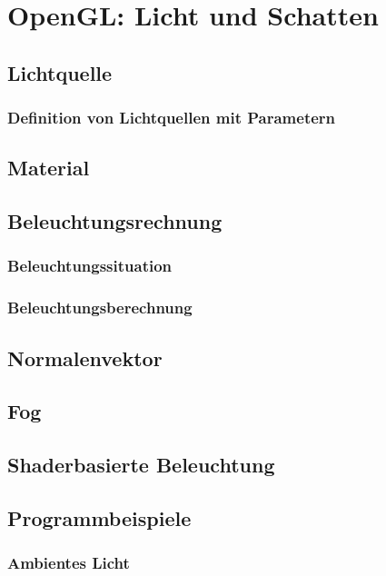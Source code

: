 \documentclass{scrreprt}
\begin{document}
\chapter{OpenGL: Licht und Schatten}

\section{Lichtquelle}

\subsection{Definition von Lichtquellen mit Parametern}

\section{Material}

\section{Beleuchtungsrechnung}
\subsection{Beleuchtungssituation}
\subsection{Beleuchtungsberechnung}

\section{Normalenvektor}

\section{Fog}

\section{Shaderbasierte Beleuchtung}

\section{Programmbeispiele}
\subsection{Ambientes Licht}
\end{document}
